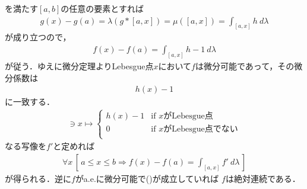 \begin{sketch}
\begin{description}
				を満たす$[a,b]$の任意の要素とすれば
				\begin{align}
					g(x) - g(a) = \lambda(g \ast [a,x]) = \mu([a,x]) = \int_{[a,x]} h\ d\lambda
				\end{align}
				が成り立つので，
				\begin{align}
					f(x) - f(a) = \int_{[a,x]} h-1\ d\lambda
				\end{align}
				が従う．ゆえに微分定理よりLebesgue点$x$において$f$は微分可能であって，その微分係数は
				\begin{align}
					h(x) - 1
				\end{align}
				に一致する．
				\begin{align}
					[a,b] \ni x \longmapsto
					\begin{cases}
						h(x) - 1 & \mbox{if $x$がLebesgue点} \\
						0 & \mbox{if $x$がLebesgue点でない} \\
					\end{cases}
				\end{align}
				なる写像を$f'$と定めれば
				\begin{align}
					\forall x\, \left[\, a \leq x \leq b \Longrightarrow f(x) - f(a) = \int_{[a,x]} f'\ d\lambda\, \right]
					\label{fom:the_fundamental_theorem_of_calculus}
				\end{align}
				が得られる．逆に$f$がa.e.に微分可能で()が成立していれば
				$f$は絶対連続である．
		\end{description}
	\end{sketch}